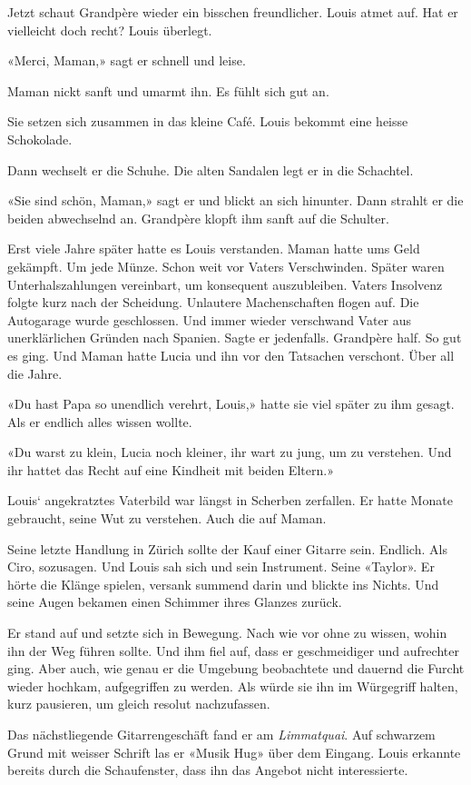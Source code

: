 Jetzt schaut Grandpère wieder ein bisschen freundlicher. Louis atmet
auf. Hat er vielleicht doch recht? Louis überlegt.

«Merci, Maman,» sagt er schnell und leise.

Maman nickt sanft und umarmt ihn. Es fühlt sich gut an.

Sie setzen sich zusammen in das kleine Café. Louis bekommt eine heisse
Schokolade.

Dann wechselt er die Schuhe. Die alten Sandalen legt er in die
Schachtel.

«Sie sind schön, Maman,» sagt er und blickt an sich hinunter. Dann
strahlt er die beiden abwechselnd an. Grandpère klopft ihm sanft auf die
Schulter.

Erst viele Jahre später hatte es Louis verstanden. Maman hatte ums Geld
gekämpft. Um jede Münze. Schon weit vor Vaters Verschwinden. Später
waren Unterhalszahlungen vereinbart, um konsequent auszubleiben. Vaters
Insolvenz folgte kurz nach der Scheidung. Unlautere Machenschaften
flogen auf. Die Autogarage wurde geschlossen. Und immer wieder
verschwand Vater aus unerklärlichen Gründen nach Spanien. Sagte er
jedenfalls. Grandpère half. So gut es ging. Und Maman hatte Lucia und
ihn vor den Tatsachen verschont. Über all die Jahre.

«Du hast Papa so unendlich verehrt, Louis,» hatte sie viel später zu ihm
gesagt. Als er endlich alles wissen wollte.

«Du warst zu klein, Lucia noch kleiner, ihr wart zu jung, um zu
verstehen. Und ihr hattet das Recht auf eine Kindheit mit beiden
Eltern.»

Louis` angekratztes Vaterbild war längst in Scherben zerfallen. Er hatte
Monate gebraucht, seine Wut zu verstehen. Auch die auf Maman.

Seine letzte Handlung in Zürich sollte der Kauf einer Gitarre sein.
Endlich. Als Ciro, sozusagen. Und Louis sah sich und sein Instrument.
Seine «Taylor». Er hörte die Klänge spielen, versank summend darin und
blickte ins Nichts. Und seine Augen bekamen einen Schimmer ihres Glanzes
zurück.

Er stand auf und setzte sich in Bewegung. Nach wie vor ohne zu wissen,
wohin ihn der Weg führen sollte. Und ihm fiel auf, dass er geschmeidiger
und aufrechter ging. Aber auch, wie genau er die Umgebung beobachtete
und dauernd die Furcht wieder hochkam, aufgegriffen zu werden. Als würde
sie ihn im Würgegriff halten, kurz pausieren, um gleich resolut
nachzufassen.

Das nächstliegende Gitarrengeschäft fand er am \emph{Limmatquai}. Auf
schwarzem Grund mit weisser Schrift las er «Musik Hug» über dem Eingang.
Louis erkannte bereits durch die Schaufenster, dass ihn das Angebot
nicht interessierte.

